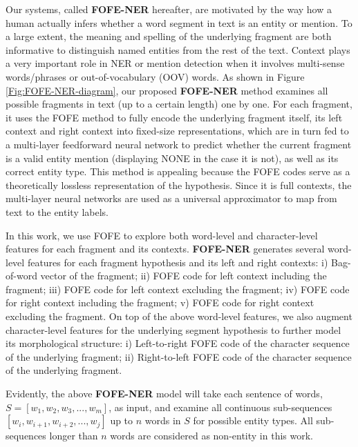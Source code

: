 \documentclass[11pt]{article}
\begin{document}
Our systems, called  \textbf{FOFE-NER} hereafter, 
are motivated by the way how a human actually infers whether a word segment in text is an entity or mention. 
To a large extent, the meaning and spelling of the underlying fragment 
are both informative to distinguish named entities from the rest of the text. 
Context plays a very important role in NER or mention detection 
when it involves multi-sense words/phrases or out-of-vocabulary (OOV) words. 
As shown in Figure \ref{Fig:FOFE-NER-diagram}, our proposed \textbf{FOFE-NER} method examines all possible fragments in text (up to a certain length) one by one. For each fragment, it uses the FOFE method to fully encode the underlying fragment itself, its left context and right context into fixed-size representations, which are in turn fed to a multi-layer feedforward neural network to predict 
whether the current fragment is a valid entity mention (displaying NONE in the case it is not), as well as its correct entity type. This method is appealing because the FOFE codes serve as a theoretically lossless representation of the hypothesis. Since it is full contexts, the multi-layer neural networks are used as a universal approximator to map from text to the entity labels. 

In this work, we use FOFE to explore both word-level and character-level features for each fragment and its contexts.
\textbf{FOFE-NER} generates several word-level features for each fragment hypothesis and its left and right contexts: 
i) Bag-of-word vector of the fragment; ii) FOFE code for left context including the fragment; iii) FOFE code for left context excluding the fragment; iv) FOFE code for right context including the fragment; v) FOFE code for right context excluding the fragment.
On top of the above word-level features, we also augment character-level features for the underlying segment hypothesis to further model its morphological structure: i) Left-to-right FOFE code of the character sequence of the underlying fragment; ii) Right-to-left FOFE code of the character sequence of the underlying fragment.

Evidently, the above \textbf{FOFE-NER} model will take each sentence of words, $S = [w_1, w_2, w_3, ..., w_m]$, as input, and examine all continuous sub-sequences $[w_i, w_{i+1}, w_{i+2}, ..., w_{j}]$ up to $n$ words in $S$ for  possible entity types. All sub-sequences longer than $n$ words are considered as non-entity in this work. 
\end{document}
